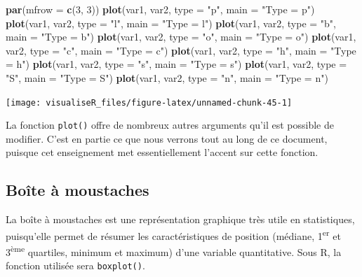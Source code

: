 \documentclass[]{article}
\newenvironment{Shaded}{\begin{snugshade}}{\end{snugshade}}
\newcommand{\DataTypeTok}[1]{\textcolor[rgb]{0.13,0.29,0.53}{#1}}
\newcommand{\DecValTok}[1]{\textcolor[rgb]{0.00,0.00,0.81}{#1}}
\newcommand{\KeywordTok}[1]{\textcolor[rgb]{0.13,0.29,0.53}{\textbf{#1}}}
\newcommand{\NormalTok}[1]{#1}
\newcommand{\StringTok}[1]{\textcolor[rgb]{0.31,0.60,0.02}{#1}}
\begin{document}
\begin{Shaded}
\begin{Highlighting}[]
\KeywordTok{par}\NormalTok{(}\DataTypeTok{mfrow =} \KeywordTok{c}\NormalTok{(}\DecValTok{3}\NormalTok{, }\DecValTok{3}\NormalTok{))}
\KeywordTok{plot}\NormalTok{(var1, var2, }\DataTypeTok{type =} \StringTok{"p"}\NormalTok{, }\DataTypeTok{main =} \StringTok{"Type = p"}\NormalTok{)}
\KeywordTok{plot}\NormalTok{(var1, var2, }\DataTypeTok{type =} \StringTok{"l"}\NormalTok{, }\DataTypeTok{main =} \StringTok{"Type = l"}\NormalTok{)}
\KeywordTok{plot}\NormalTok{(var1, var2, }\DataTypeTok{type =} \StringTok{"b"}\NormalTok{, }\DataTypeTok{main =} \StringTok{"Type = b"}\NormalTok{)}
\KeywordTok{plot}\NormalTok{(var1, var2, }\DataTypeTok{type =} \StringTok{"o"}\NormalTok{, }\DataTypeTok{main =} \StringTok{"Type = o"}\NormalTok{)}
\KeywordTok{plot}\NormalTok{(var1, var2, }\DataTypeTok{type =} \StringTok{"c"}\NormalTok{, }\DataTypeTok{main =} \StringTok{"Type = c"}\NormalTok{)}
\KeywordTok{plot}\NormalTok{(var1, var2, }\DataTypeTok{type =} \StringTok{"h"}\NormalTok{, }\DataTypeTok{main =} \StringTok{"Type = h"}\NormalTok{)}
\KeywordTok{plot}\NormalTok{(var1, var2, }\DataTypeTok{type =} \StringTok{"s"}\NormalTok{, }\DataTypeTok{main =} \StringTok{"Type = s"}\NormalTok{)}
\KeywordTok{plot}\NormalTok{(var1, var2, }\DataTypeTok{type =} \StringTok{"S"}\NormalTok{, }\DataTypeTok{main =} \StringTok{"Type = S"}\NormalTok{)}
\KeywordTok{plot}\NormalTok{(var1, var2, }\DataTypeTok{type =} \StringTok{"n"}\NormalTok{, }\DataTypeTok{main =} \StringTok{"Type = n"}\NormalTok{)}
\end{Highlighting}
\end{Shaded}

\begin{center}\texttt{[image: visualiseR\_files/figure-latex/unnamed-chunk-45-1]} \end{center}

La fonction \texttt{plot()} offre de nombreux autres arguments qu'il est possible de modifier. C'est en partie ce que nous verrons tout au long de ce document, puisque cet enseignement met essentiellement l'accent sur cette fonction.

\hypertarget{bouxeete-uxe0-moustaches}{%
\subsection{Boîte à moustaches}\label{bouxeete-uxe0-moustaches}}

La boîte à moustaches est une représentation graphique très utile en
statistiques, puisqu'elle permet de résumer les caractéristiques de position
(médiane, 1\textsuperscript{er} et 3\textsuperscript{ème} quartiles, minimum et maximum) d'une variable
quantitative. Sous R, la fonction utilisée sera \texttt{boxplot()}.
\end{document}
